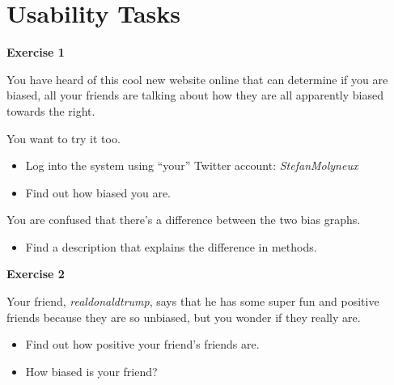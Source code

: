 \chapter{Usability Tasks}\label{app:UXTasks}

\textbf{Exercise 1}\nl

You have heard of this cool new website online that can determine if you are
biased, all your friends are talking about how they are all apparently biased
towards the right.\nl

You want to try it too.

\begin{itemize}
  \item Log into the system using “your” Twitter account:
  \textit{StefanMolyneux}
  \item Find out how biased you are.
\end{itemize}

You are confused that there’s a difference between the two bias graphs.

\begin{itemize}
  \item Find a description that explains the difference in methods.
\end{itemize}

\textbf{Exercise 2}\nl

Your friend, \textit{realdonaldtrump}, says that he has some super fun and
positive friends because they are so unbiased, but you wonder if they really
are.


\begin{itemize}
  \item Find out how positive your friend’s friends are.
  \item How biased is your friend?
\end{itemize}
